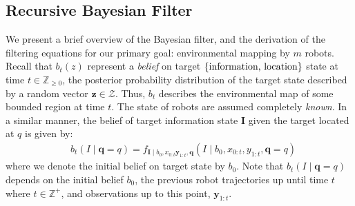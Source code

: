 \documentclass[letterpaper, 10 pt, conference]{ieeeconf}
\begin{document}
\subsection{Recursive Bayesian Filter}
We present a brief overview of the Bayesian filter, and the derivation of the filtering equations for our primary goal: environmental mapping by $m$ robots. 
Recall that $b_t(z)$ represent a \emph{belief} on target $\lbrace \textup{information, location}\rbrace$ state at time $t \in \mathbb{Z}_{\geq 0}$, the posterior probability distribution of the target state described by a random vector $\bm{z} \in \mathcal{Z}$. Thus, $b_t$ describes the  environmental map of some bounded region at time $t$. The state of robots are assumed completely \emph{known}.
In a similar manner, the belief of target information state $\bm{I}$ given the target located at $q$ is given by:
\begin{align}
&b_t(I \mid \bm{q} = q) = f_{\bm{I}\mid b_0,{x}_{0:t}\bm{y}_{1:t},\bm{q}}\left(I \mid b_0,{x}_{0:t},y_{1:t},\bm{q}=q\right)
\label{eqb}
\end{align}
where we denote the initial belief on target state by $b_0$.
Note that $b_t(I \mid \bm{q} = q)$ depends on the initial belief $b_0$, the previous robot trajectories up until time $t$ where $t\in \mathbb{Z}^{+}$, and observations up to this point, $\bm{y}_{1:t}$. 
\end{document}
